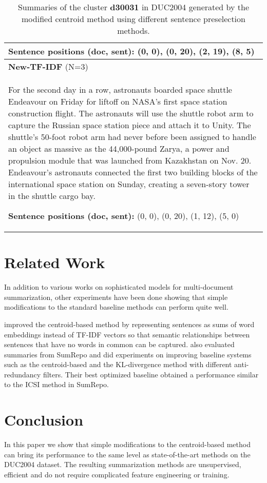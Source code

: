 \documentclass[11pt,letterpaper]{article}
\begin{document}
\begin{table*}[t]
\begin{tabular}{|p{15.5cm}|}
		\textbf{Sentence positions (doc, sent):} (0, 0), (0, 20), (2, 19), (8, 5)
		\\ \hline
		\textbf{New-TF-IDF }(N=3)\\ 
		\small
		For the second day in a row, astronauts boarded space shuttle Endeavour on Friday for liftoff on NASA's first space station construction flight. The astronauts will use the shuttle robot arm to capture the Russian space station piece and attach it to Unity. The shuttle's 50-foot robot arm had never before been assigned to handle an object as massive as the 44,000-pound Zarya, a power and propulsion module that was launched from Kazakhstan on Nov. 20. Endeavour's astronauts connected the first two building blocks of the international space station on Sunday, creating a seven-story tower in the shuttle cargo bay.
		
		
		\textbf{Sentence positions (doc, sent):} (0, 0), (0, 20), (1, 12), (5, 0)
		\\ \hline
	\end{tabular}
	\caption{Summaries of the cluster \textbf{d30031} in DUC2004 generated by the modified centroid method using different sentence preselection methods. }
	\label{example}
\end{table*}
\section{Related Work}
In addition to various works on sophisticated models for multi-document summarization, other experiments have been done showing that simple modifications to the standard baseline methods can perform quite well.

\citet{Rossiello2017CentroidbasedTS} improved the centroid-based method by representing sentences as sums of word embeddings instead of TF-IDF vectors so that semantic relationships between sentences that have no words in common can be captured. 
\citet{mackie2016experiments} also evaluated summaries from SumRepo and did experiments on improving baseline systems such as the centroid-based and the KL-divergence method with different anti-redundancy filters. Their best optimized baseline obtained a performance similar to the ICSI method in SumRepo.
\section{Conclusion}
In this paper we show that simple modifications to the centroid-based method can bring its performance to the same level as state-of-the-art methods on the DUC2004 dataset. The resulting summarization methods are unsupervised, efficient and do not require complicated feature engineering or training.
\end{document}
